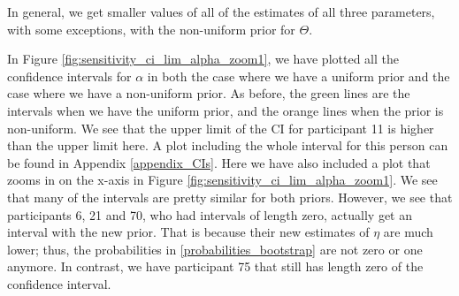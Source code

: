 In general, we get smaller values of all of the estimates of all three parameters, with some exceptions, with the non-uniform prior for $\Theta$.

In Figure \ref{fig:sensitivity_ci_lim_alpha_zoom1}, we have plotted all the confidence intervals for $\alpha$ in both the case where we have a uniform prior and the case where we have a non-uniform prior. As before, the green lines are the intervals when we have the uniform prior, and the orange lines when the prior is non-uniform. We see that the upper limit of the CI for participant 11 is higher than the upper limit here. A plot including the whole interval for this person can be found in Appendix \ref{appendix_CIs}. Here we have also included a plot that zooms in on the x-axis in Figure \ref{fig:sensitivity_ci_lim_alpha_zoom1}.
We see that many of the intervals are pretty similar for both priors. However, we see that participants 6, 21 and 70, who had intervals of length zero, actually get an interval with the new prior. That is because their new estimates of $\eta$ are much lower; thus, the probabilities in \eqref{probabilities_bootstrap} are not zero or one anymore. In contrast, we have participant 75 that still has length zero of the confidence interval.

